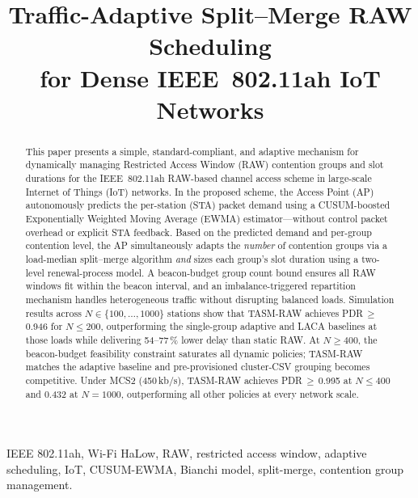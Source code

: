 \documentclass[conference]{IEEEtran}
\begin{document}
\title{Traffic-Adaptive Split--Merge RAW Scheduling\\
for Dense IEEE~802.11ah IoT Networks}

\author{
}

\maketitle

\begin{abstract}
This paper presents a simple, standard-compliant, and adaptive mechanism
for dynamically managing Restricted Access Window (RAW) contention groups
and slot durations for the IEEE~802.11ah RAW-based channel access scheme
in large-scale Internet of Things (IoT) networks.
In the proposed scheme, the Access Point (AP) autonomously predicts the
per-station (STA) packet demand using a CUSUM-boosted Exponentially
Weighted Moving Average (EWMA) estimator---without control packet overhead
or explicit STA feedback.
Based on the predicted demand and per-group contention level, the AP
simultaneously adapts the \emph{number} of contention groups via a
load-median split--merge algorithm \emph{and} sizes each group's slot
duration using a two-level renewal-process model.
A beacon-budget group count bound ensures all RAW windows fit within the
beacon interval, and an imbalance-triggered repartition mechanism handles
heterogeneous traffic without disrupting balanced loads.
Simulation results across $N\!\in\!\{100,\ldots,1000\}$ stations show
that TASM-RAW achieves PDR\,$\geq$\,0.946 for $N\!\leq\!200$,
outperforming the single-group adaptive and LACA baselines at those
loads while delivering 54--77\,\% lower delay than static RAW.
At $N\!\geq\!400$, the beacon-budget feasibility constraint saturates all
dynamic policies; TASM-RAW matches the adaptive baseline and
pre-provisioned cluster-CSV grouping becomes competitive.
Under MCS2 (450\,kb/s), TASM-RAW achieves PDR\,$\geq$\,0.995 at
$N\!\leq\!400$ and 0.432 at $N\!=\!1000$, outperforming all other
policies at every network scale.
\end{abstract}

\begin{IEEEkeywords}
IEEE 802.11ah, Wi-Fi HaLow, RAW, restricted access window, adaptive
scheduling, IoT, CUSUM-EWMA, Bianchi model, split-merge, contention
group management.
\end{IEEEkeywords}
\end{document}
